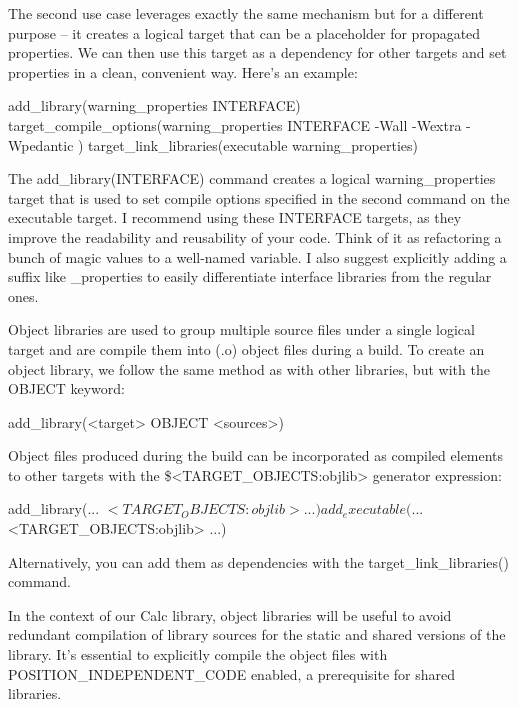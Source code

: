 The second use case leverages exactly the same mechanism but for a different purpose – it creates a logical target that can be a placeholder for propagated properties. We can then use this target as a dependency for other targets and set properties in a clean, convenient way. Here’s an example:

\begin{cmake}
add_library(warning_properties INTERFACE)
target_compile_options(warning_properties INTERFACE
    -Wall -Wextra -Wpedantic
)
target_link_libraries(executable warning_properties)
\end{cmake}

The add\_library(INTERFACE) command creates a logical warning\_properties target that is used to set compile options specified in the second command on the executable target. I recommend using these INTERFACE targets, as they improve the readability and reusability of your code. Think of it as refactoring a bunch of magic values to a well-named variable. I also suggest explicitly adding a suffix like \_properties to easily differentiate interface libraries from the regular ones.


Object libraries are used to group multiple source files under a single logical target and are compile them into (.o) object files during a build. To create an object library, we follow the same method as with other libraries, but with the OBJECT keyword:

\begin{shell}
add_library(<target> OBJECT <sources>)
\end{shell}

Object files produced during the build can be incorporated as compiled elements to other targets with the \$<TARGET\_OBJECTS:objlib> generator expression:

\begin{shell}
add_library(... $<TARGET_OBJECTS:objlib> ...)
add_executable(... $<TARGET_OBJECTS:objlib> ...)
\end{shell}

Alternatively, you can add them as dependencies with the target\_link\_libraries() command.

In the context of our Calc library, object libraries will be useful to avoid redundant compilation of library sources for the static and shared versions of the library. It’s essential to explicitly compile the object files with POSITION\_INDEPENDENT\_CODE enabled, a prerequisite for shared libraries.

